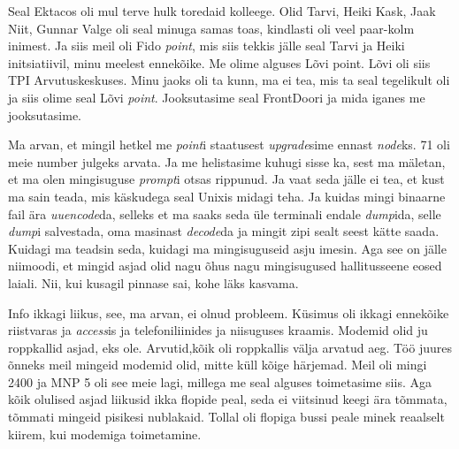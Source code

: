 
Seal Ektacos oli mul terve hulk toredaid kolleege. Olid 
Tarvi, Heiki Kask, Jaak 
Niit, Gunnar Valge oli seal 
minuga samas toas, kindlasti oli veel paar-kolm inimest. Ja siis meil oli 
Fido \emph{point}, mis siis tekkis jälle seal Tarvi ja Heiki 
initsiatiivil, minu meelest ennekõike. Me olime alguses Lõvi point. 
Lõvi oli siis TPI 
Arvutuskeskuses. Minu jaoks oli ta 
kunn, ma ei tea, mis ta seal tegelikult oli ja siis olime seal Lõvi 
\emph{point}. Jooksutasime seal FrontDoori ja mida iganes me jooksutasime. 

Ma arvan, et mingil hetkel me \emph{point}i staatusest \emph{upgrade}sime 
ennast \emph{node}ks. 71 oli meie number julgeks arvata. Ja me helistasime 
kuhugi sisse ka, sest ma mäletan, et ma olen mingisuguse \emph{prompt}i otsas 
rippunud. Ja vaat seda jälle ei tea, et kust ma sain teada, mis käskudega seal 
Unixis midagi teha. Ja kuidas mingi binaarne fail ära 
\emph{uuencode}da, selleks et ma saaks seda üle terminali endale 
\emph{dump}ida, selle \emph{dump}i salvestada, oma masinast \emph{decode}da ja 
mingit zipi sealt seest kätte saada. Kuidagi ma teadsin seda, kuidagi ma 
mingisuguseid asju imesin. Aga see on jälle niimoodi, et mingid asjad olid nagu 
õhus nagu mingisugused hallitusseene eosed laiali. Nii, kui kusagil pinnase 
sai, kohe läks kasvama. 


Info ikkagi liikus, see, ma arvan, ei olnud probleem. Küsimus oli ikkagi 
ennekõike riistvaras ja \emph{access}is ja  telefoniliinides ja niisuguses 
kraamis. Modemid olid ju roppkallid asjad, eks ole. Arvutid,kõik oli roppkallis 
välja arvatud aeg. Töö juures õnneks meil mingeid modemid olid, mitte küll 
kõige härjemad. Meil oli mingi 2400 ja MNP 5 oli see meie lagi, millega me seal alguses toimetasime siis. 
Aga kõik olulised asjad liikusid ikka flopide peal,  seda ei viitsinud keegi 
ära tõmmata, tõmmati mingeid pisikesi nublakaid. Tollal oli flopiga bussi peale 
minek reaalselt kiirem, kui modemiga toimetamine.


